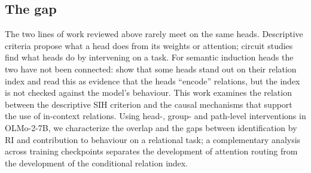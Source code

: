 \subsection{The gap}
\label{sec:rw-gap}

The two lines of work reviewed above rarely meet on the same heads. Descriptive
criteria propose what a head does from its weights or attention; circuit studies
find what heads do by intervening on a task. For semantic induction heads the two
have not been connected: \citet{ren2024semantic} show that some heads stand out on
their relation index and read this as evidence that the heads ``encode'' relations,
but the index is not checked against the model's behaviour. This work examines the
relation between the descriptive SIH criterion and the causal mechanisms that
support the use of in-context relations. Using head-, group- and path-level
interventions in OLMo-2-7B, we characterize the overlap and the gaps between
identification by RI and contribution to behaviour on a relational task; a
complementary analysis across training checkpoints separates the development of
attention routing from the development of the conditional relation index.
